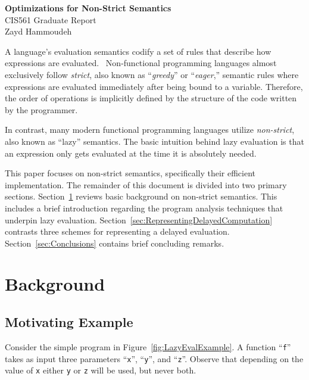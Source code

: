 \documentclass[11pt]{article}
\begin{document}
\begin{center}
  \textbf{\Large Optimizations for Non-Strict Semantics}\\\vspace{3pt}
  {\large CIS561 Graduate Report}\\\vspace{3pt}
  Zayd Hammoudeh
\end{center}

A language's evaluation semantics codify a set of rules that describe how expressions are evaluated.~\cite{hoover:Notes}  Non-functional programming languages almost exclusively follow \textit{strict}, also known as ``\textit{greedy}'' or ``\textit{eager},'' semantic rules where expressions are evaluated immediately after being bound to a variable.  Therefore, the order of operations is implicitly defined by the structure of the code written by the programmer.

In contrast, many modern functional programming languages utilize \textit{non-strict}, also known as ``lazy'' semantics. The basic intuition behind lazy evaluation is that an expression only gets evaluated at the time it is absolutely needed.

This paper focuses on non-strict semantics, specifically their efficient implementation. The remainder of this document is divided into two primary sections. Section~\ref{sec:Background} reviews basic background on non-strict semantics.  This includes a brief introduction regarding the program analysis techniques that underpin lazy evaluation.  Section~\ref{sec:RepresentingDelayedComputation} contrasts three schemes for representing a delayed evaluation. Section~\ref{sec:Conclusions} contains brief concluding remarks.

\section{Background}\label{sec:Background}

\subsection{Motivating Example}

Consider the simple program in Figure~\ref{fig:LazyEvalExample}.  A function ``\texttt{f}'' takes as input three parameters ``\texttt{x}'', ``\texttt{y}'', and ``\texttt{z}''.  Observe that depending on the value of \texttt{x} either \texttt{y} or \texttt{z} will be used, but never both.~\cite{Henderson:1976}
\end{document}
